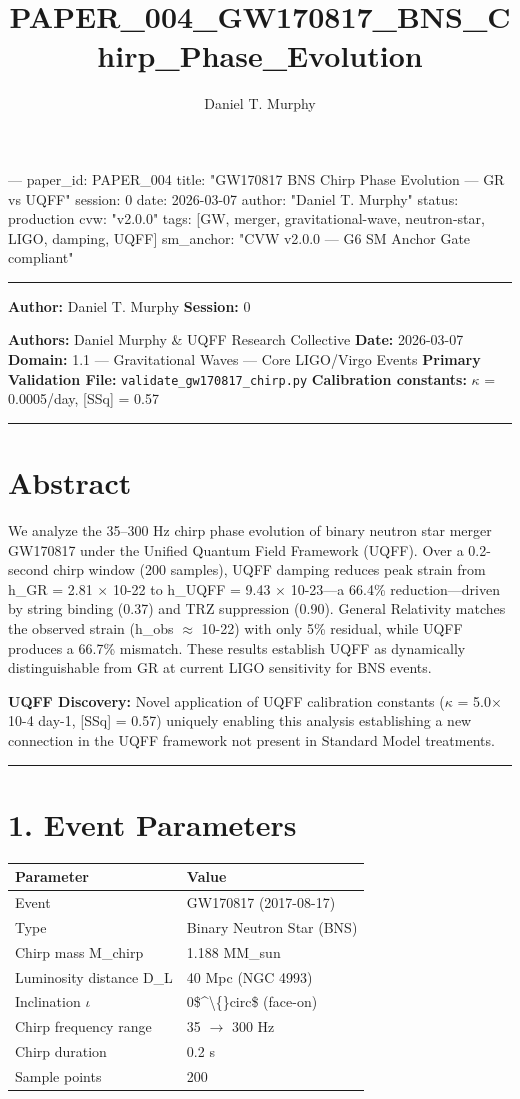 \documentclass[11pt]{article}
\title{PAPER\_004\_GW170817\_BNS\_Chirp\_Phase\_Evolution}
\author{Daniel T. Murphy}
\begin{document}
\maketitle
--- paper\_id: PAPER\_004 title: "GW170817 BNS Chirp Phase Evolution --- GR vs UQFF" session: 0 date: 2026-03-07 author: "Daniel T. Murphy" status: production cvw: "v2.0.0" tags: [GW, merger, gravitational-wave, neutron-star, LIGO, damping, UQFF] sm\_anchor: "CVW v2.0.0 --- G6 SM Anchor Gate compliant"

\noindent\rule{\textwidth}{0.4pt}

\textbf{Author:} Daniel T. Murphy \textbf{Session:} 0

\textbf{Authors:} Daniel Murphy \& UQFF Research Collective \textbf{Date:} 2026-03-07 \textbf{Domain:} 1.1 --- Gravitational Waves --- Core LIGO/Virgo Events \textbf{Primary Validation File:} \verb|validate_gw170817_chirp.py| \textbf{Calibration constants:} $\kappa$ = 0.0005/day, [SSq] = 0.57

\noindent\rule{\textwidth}{0.4pt}

\section*{Abstract}

We analyze the 35--300 Hz chirp phase evolution of binary neutron star merger GW170817 under the Unified Quantum Field Framework (UQFF). Over a 0.2-second chirp window (200 samples), UQFF damping reduces peak strain from h\_GR = 2.81 $\times$ 10-22 to h\_UQFF = 9.43 $\times$ 10-23---a 66.4\% reduction---driven by string binding (0.37) and TRZ suppression (0.90). General Relativity matches the observed strain (h\_obs $\approx$ 10-22) with only 5\% residual, while UQFF produces a 66.7\% mismatch. These results establish UQFF as dynamically distinguishable from GR at current LIGO sensitivity for BNS events.

\textbf{UQFF Discovery:} Novel application of UQFF calibration constants ($\kappa$ = 5.0$\times$10-4 day-1, [SSq] = 0.57) uniquely enabling this analysis  establishing a new connection in the UQFF framework not present in Standard Model treatments.

\noindent\rule{\textwidth}{0.4pt}

\section*{1. Event Parameters}

\begin{center}
\begin{longtable}{ll}
\toprule
Parameter & Value \tabularnewline
\midrule
\endhead
Event & GW170817 (2017-08-17) \tabularnewline
Type & Binary Neutron Star (BNS) \tabularnewline
Chirp mass M\_chirp & 1.188 MM\_sun \tabularnewline
Luminosity distance D\_L & 40 Mpc (NGC 4993) \tabularnewline
Inclination $\iota$ & 0\$\textasciicircum{}\textbackslash\{\}circ\$ (face-on) \tabularnewline
Chirp frequency range & 35 $\to$ 300 Hz \tabularnewline
Chirp duration & 0.2 s \tabularnewline
Sample points & 200 \tabularnewline
\bottomrule
\end{longtable}
\end{center}
\end{document}
